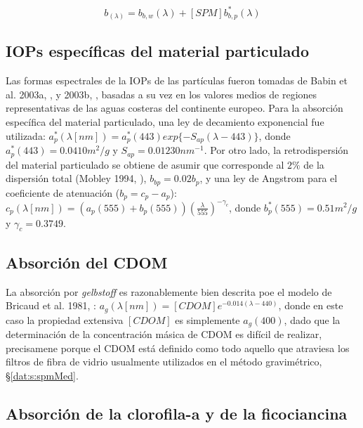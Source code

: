     \begin{equation}
        b_(\lambda) =
        b_{b,w}(\lambda) + 
        [SPM]b_{b,p}^{*}(\lambda)
        \label{qssa:eq:bb_componentes}
    \end{equation}

    \subsection{IOPs específicas del material particulado}
    \label{qssa:s:iops_spm}
    
        Las formas espectrales de la IOPs de las partículas fueron tomadas de Babin et al. 2003a, \cite{babin2003a}, y 2003b, \cite{babin2003b}, basadas a su vez en los valores medios de regiones representativas de las aguas costeras del continente europeo.
        Para la absorción específica del material particulado, una ley de decamiento exponencial fue utilizada: $a^{*}_{p}(\lambda [nm]) = a^{*}_{p}(443)exp\{-S_{ap}(\lambda - 443)\}$, donde $a^{*}_{p}(443) = 0.0410 m^{2}/g$ y $S_{ap} = 0.01230nm^{-1}$.
        Por otro lado, la retrodispersión del material particulado se obtiene de asumir que corresponde al $2\%$ de la dispersión total (Mobley 1994, \cite{mobley1994}), $b_{bp} = 0.02 b_{p}$, y una ley de Angstrom para el coeficiente de atenuación ($b_{p} = c_{p} - a_{p}$): $c_{p}(\lambda [nm]) = (a_{p}(555) + b_{p}(555))(\frac{\lambda}{555})^{-\gamma_{c}}$, donde $b_{p}^{*}(555) = 0.51 m^{2}/g$ y $\gamma_{c} = 0.3749$.

    \subsection{Absorción del CDOM}
    \label{qssa:s:abs_cdom}

        La absorción por \textit{gelbstoff} es razonablemente bien descrita poe el modelo de Bricaud et al. 1981, \cite{bricaud1981}: $a_{g}(\lambda[nm]) = [CDOM]e^{-0.014(\lambda-440)}$, donde en este caso la propiedad extensiva $[CDOM]$ es simplemente $a_{g}(400)$, dado que la determinación de la concentración másica de CDOM es difícil de realizar, precisamene porque el CDOM está definido como todo aquello que atraviesa los filtros de fibra de vidrio usualmente utilizados en el método gravimétrico, \S \ref{dat:s:spmMed}.

    \subsection{Absorción de la clorofila-a y de la ficociancina}
    \label{qssa:s:abs_pigmentos}
    
